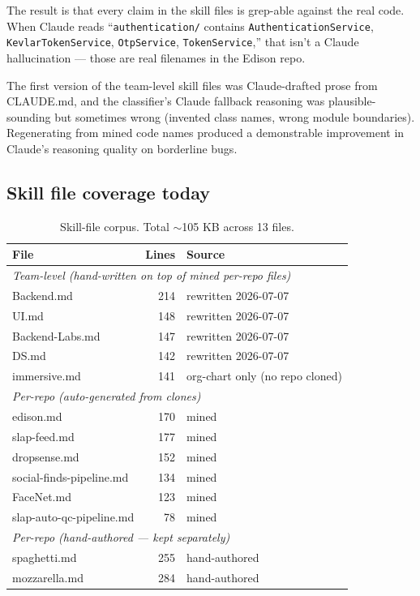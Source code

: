 \documentclass[11pt,a4paper]{article}
\begin{document}
The result is that every claim in the skill files is grep-able against the
real code. When Claude reads
``\texttt{authentication/} contains \texttt{AuthenticationService},
\texttt{KevlarTokenService}, \texttt{OtpService}, \texttt{TokenService},''
that isn't a Claude hallucination --- those are real filenames in the
Edison repo.

\begin{decisionbox}
The first version of the team-level skill files was Claude-drafted prose
from CLAUDE.md, and the classifier's Claude fallback reasoning was
plausible-sounding but sometimes wrong (invented class names, wrong
module boundaries). Regenerating from mined code names produced a
demonstrable improvement in Claude's reasoning quality on borderline
bugs.
\end{decisionbox}

\subsection{Skill file coverage today}

\begin{table}[h]
\centering
\small
\begin{tabular}{lrl}
\toprule
\textbf{File} & \textbf{Lines} & \textbf{Source} \\
\midrule
\multicolumn{3}{l}{\textit{Team-level (hand-written on top of mined per-repo files)}} \\
\quad Backend.md          & 214 & rewritten 2026-07-07 \\
\quad UI.md               & 148 & rewritten 2026-07-07 \\
\quad Backend-Labs.md     & 147 & rewritten 2026-07-07 \\
\quad DS.md               & 142 & rewritten 2026-07-07 \\
\quad immersive.md        & 141 & org-chart only (no repo cloned) \\
\midrule
\multicolumn{3}{l}{\textit{Per-repo (auto-generated from clones)}} \\
\quad edison.md           & 170 & mined \\
\quad slap-feed.md        & 177 & mined \\
\quad dropsense.md        & 152 & mined \\
\quad social-finds-pipeline.md & 134 & mined \\
\quad FaceNet.md          & 123 & mined \\
\quad slap-auto-qc-pipeline.md & 78 & mined \\
\midrule
\multicolumn{3}{l}{\textit{Per-repo (hand-authored --- kept separately)}} \\
\quad spaghetti.md        & 255 & hand-authored \\
\quad mozzarella.md       & 284 & hand-authored \\
\bottomrule
\end{tabular}
\caption{Skill-file corpus. Total $\sim$105 KB across 13 files.}
\end{table}
\end{document}
